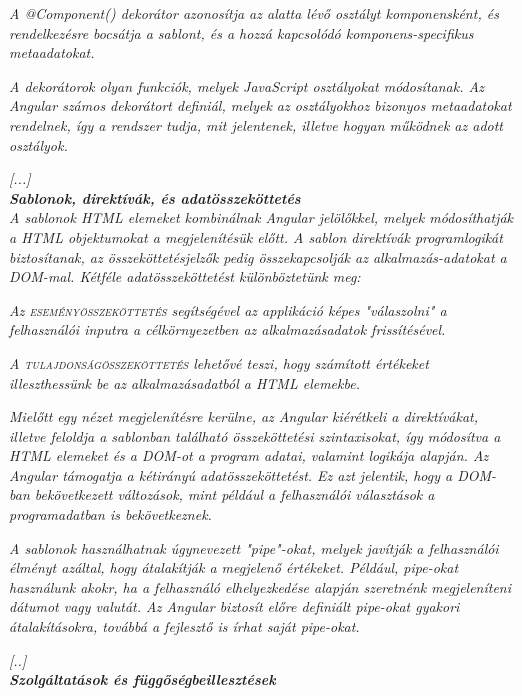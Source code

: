 \textit{A @Component() dekorátor azonosítja az alatta lévő osztályt komponensként, és rendelkezésre bocsátja a sablont, és a hozzá kapcsolódó komponens-specifikus metaadatokat.}

\textit{A dekorátorok olyan funkciók, melyek JavaScript osztályokat módosítanak. Az Angular számos dekorátort definiál, melyek az osztályokhoz bizonyos metaadatokat rendelnek, így a rendszer tudja, mit jelentenek, illetve hogyan működnek az adott osztályok.}

\textit{[...]}\\

\noindent\textit{\textbf{Sablonok, direktívák, és adatösszeköttetés}}\\

\textit{A sablonok HTML elemeket kombinálnak Angular jelölőkkel, melyek módosíthatják a HTML objektumokat a megjelenítésük előtt. A sablon direktívák programlogikát biztosítanak, az összeköttetésjelzők pedig összekapcsolják az alkalmazás-adatokat a DOM-mal. Kétféle adatösszeköttetést különböztetünk meg:}

\textit{Az \textsc{eseményösszeköttetés} segítségével az applikáció képes "válaszolni" a felhasználói inputra a célkörnyezetben az alkalmazásadatok frissítésével.}

\textit{A \textsc{tulajdonságösszeköttetés} lehetővé teszi, hogy számított értékeket illeszthessünk be az alkalmazásadatból a HTML elemekbe.}

\textit{Mielőtt egy nézet megjelenítésre kerülne, az Angular kiérétkeli a direktívákat, illetve feloldja a sablonban található összeköttetési szintaxisokat, így módosítva a HTML elemeket és a DOM-ot a program adatai, valamint logikája alapján. Az Angular támogatja a kétirányú adatösszeköttetést. Ez azt jelentik, hogy a DOM-ban bekövetkezett változások, mint például a felhasználói választások a programadatban is bekövetkeznek.}

\textit{A sablonok használhatnak úgynevezett "pipe"-okat, melyek javítják a felhasználói élményt azáltal, hogy átalakítják a megjelenő értékeket. Például, pipe-okat használunk akokr, ha a felhasználó elhelyezkedése alapján szeretnénk megjeleníteni dátumot vagy valutát. Az Angular biztosít előre definiált pipe-okat gyakori átalakításokra, továbbá a fejlesztő is írhat saját pipe-okat.}

\textit{[..]}\\

\noindent\textit{\textbf{Szolgáltatások és függőségbeillesztések}}\\

